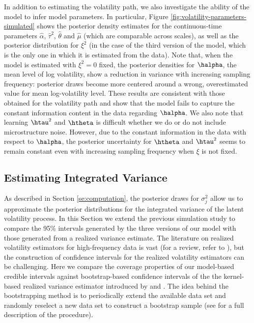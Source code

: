 In addition to estimating the volatility path, we also investigate the ability of the model to infer model parameters.  In particular, Figure \ref{fig:volatility-parameters-simulated} shows the posterior density estimates for the continuous-time parameters $\hat{\alpha}$, $\hat{\tau}^2$, $\hat{\theta}$ and $\hat{\mu}$ (which are comparable across scales), as well as the posterior distribution for $\xi^2$ (in the case of the third version of the model, which is the only one in which it is estimated from the data).  Note that, when the model is estimated with $\xi^2 = 0$ fixed, the posterior densities for $\halpha$, the mean level of log volatility, show a reduction in variance with increasing sampling frequency:  posterior draws become more centered around a wrong, overestimated value for mean log-volatility level. These results are consistent with those obtained for the volatility path and show that the model fails to capture the constant information content in the data regarding $\halpha$.  We also note that learning $\htau^2$ and $\htheta$ is difficult whether we do or do not include microstructure noise. However, due to the constant information in the data with respect to $\halpha$, the posterior uncertainty for $\htheta$ and $\htau^2$ seems to remain constant even with increasing sampling frequency when $\xi$ is not fixed.

\subsection{Estimating Integrated Variance}

As described in Section \ref{se:computation}, the posterior draws for $\sigma^2_{j}$ allow us to approximate the posterior distributions for the integrated variance of the latent volatility process. In this Section we extend the previous simulation study to compare the 95\% intervals generated by the three versions of our model with those generated from a realized variance estimate.  The literature on realized volatility estimators for high-frequency data is vast (for a review, refer to \cite{pigorsch2012volatility}), but the construction of confidence intervals for the realized volatility estimators can be challenging.  Here we compare the coverage properties of our model-based credible intervals against bootstrap-based confidence intervals of the the kernel-based realized variance estimator introduced by \cite{zhou1996high} and \cite{hansen2006realized}. The idea behind the bootstrapping method is to periodically extend the available data set and randomly reselect a new data set to construct a bootstrap sample (see \cite{hwang2013stationary-bootstrap} for a full description of the procedure).

